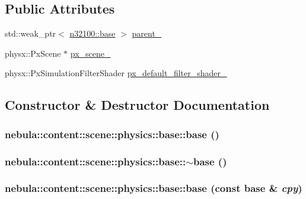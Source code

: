 \subsection*{Public Attributes}
\begin{DoxyCompactItemize}
\item 
std::weak\_\-ptr$<$ \hyperlink{classnebula_1_1content_1_1scene_1_1admin_1_1base}{n32100::base} $>$ \hyperlink{classnebula_1_1content_1_1scene_1_1physics_1_1base_ac61fddd3f97a0f0589c70a363ea68d22}{parent\_\-}
\item 
physx::PxScene $\ast$ \hyperlink{classnebula_1_1content_1_1scene_1_1physics_1_1base_af85fa3dbc4cdc266abcd21e33931b0a0}{px\_\-scene\_\-}
\item 
physx::PxSimulationFilterShader \hyperlink{classnebula_1_1content_1_1scene_1_1physics_1_1base_a20237948f85598811a28a29c3a886f72}{px\_\-default\_\-filter\_\-shader\_\-}
\end{DoxyCompactItemize}


\subsection{Constructor \& Destructor Documentation}
\hypertarget{classnebula_1_1content_1_1scene_1_1physics_1_1base_a021797216ccfeeb832000af0f292f808}{
\subsubsection[{base}]{\setlength{\rightskip}{0pt plus 5cm}nebula::content::scene::physics::base::base ()}}
\label{classnebula_1_1content_1_1scene_1_1physics_1_1base_a021797216ccfeeb832000af0f292f808}
\hypertarget{classnebula_1_1content_1_1scene_1_1physics_1_1base_a793813e3721069c38cb7920eb4c23611}{
\subsubsection[{$\sim$base}]{\setlength{\rightskip}{0pt plus 5cm}nebula::content::scene::physics::base::$\sim$base ()}}
\label{classnebula_1_1content_1_1scene_1_1physics_1_1base_a793813e3721069c38cb7920eb4c23611}
\hypertarget{classnebula_1_1content_1_1scene_1_1physics_1_1base_a45a906d04de5d389baa2b681e557b6ce}{
\subsubsection[{base}]{\setlength{\rightskip}{0pt plus 5cm}nebula::content::scene::physics::base::base (const {\bf base} \& {\em cpy})}}
\label{classnebula_1_1content_1_1scene_1_1physics_1_1base_a45a906d04de5d389baa2b681e557b6ce}


